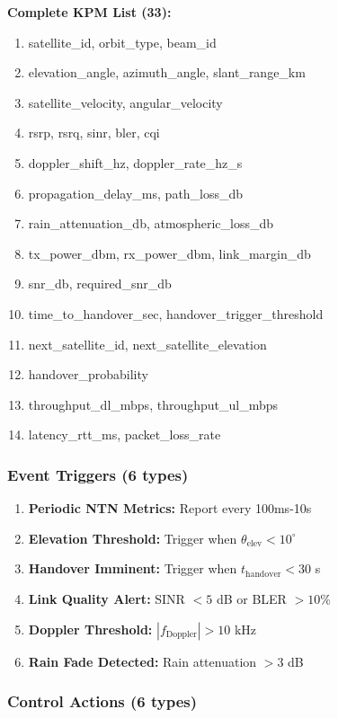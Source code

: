 \documentclass[conference]{IEEEtran}
\begin{document}
\textbf{Complete KPM List (33):}
\begin{enumerate}
    \item satellite\_id, orbit\_type, beam\_id
    \item elevation\_angle, azimuth\_angle, slant\_range\_km
    \item satellite\_velocity, angular\_velocity
    \item rsrp, rsrq, sinr, bler, cqi
    \item doppler\_shift\_hz, doppler\_rate\_hz\_s
    \item propagation\_delay\_ms, path\_loss\_db
    \item rain\_attenuation\_db, atmospheric\_loss\_db
    \item tx\_power\_dbm, rx\_power\_dbm, link\_margin\_db
    \item snr\_db, required\_snr\_db
    \item time\_to\_handover\_sec, handover\_trigger\_threshold
    \item next\_satellite\_id, next\_satellite\_elevation
    \item handover\_probability
    \item throughput\_dl\_mbps, throughput\_ul\_mbps
    \item latency\_rtt\_ms, packet\_loss\_rate
\end{enumerate}

\subsubsection{Event Triggers (6 types)}

\begin{enumerate}
    \item \textbf{Periodic NTN Metrics:} Report every 100ms-10s
    \item \textbf{Elevation Threshold:} Trigger when $\theta_{\text{elev}} < 10^\circ$
    \item \textbf{Handover Imminent:} Trigger when $t_{\text{handover}} < 30$ s
    \item \textbf{Link Quality Alert:} SINR $< 5$ dB or BLER $> 10\%$
    \item \textbf{Doppler Threshold:} $|f_{\text{Doppler}}| > 10$ kHz
    \item \textbf{Rain Fade Detected:} Rain attenuation $> 3$ dB
\end{enumerate}

\subsubsection{Control Actions (6 types)}
\end{document}
